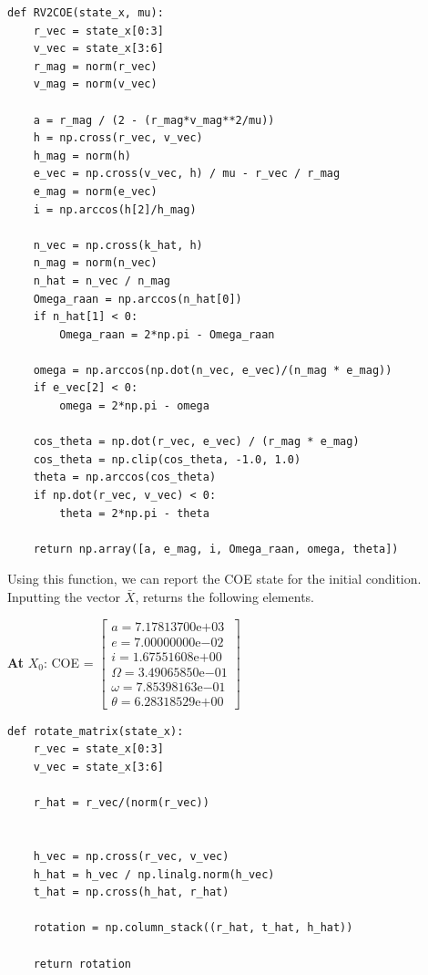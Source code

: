 \documentclass[a4paper, 12pt]{article}  %
\begin{document}
\begin{lstlisting}
def RV2COE(state_x, mu):
    r_vec = state_x[0:3]
    v_vec = state_x[3:6]
    r_mag = norm(r_vec)
    v_mag = norm(v_vec)
    
    a = r_mag / (2 - (r_mag*v_mag**2/mu))
    h = np.cross(r_vec, v_vec)
    h_mag = norm(h)
    e_vec = np.cross(v_vec, h) / mu - r_vec / r_mag
    e_mag = norm(e_vec)
    i = np.arccos(h[2]/h_mag)
    
    n_vec = np.cross(k_hat, h)
    n_mag = norm(n_vec)
    n_hat = n_vec / n_mag
    Omega_raan = np.arccos(n_hat[0])
    if n_hat[1] < 0:
        Omega_raan = 2*np.pi - Omega_raan
    
    omega = np.arccos(np.dot(n_vec, e_vec)/(n_mag * e_mag))
    if e_vec[2] < 0:
        omega = 2*np.pi - omega
        
    cos_theta = np.dot(r_vec, e_vec) / (r_mag * e_mag)
    cos_theta = np.clip(cos_theta, -1.0, 1.0)  
    theta = np.arccos(cos_theta)
    if np.dot(r_vec, v_vec) < 0:
        theta = 2*np.pi - theta
    
    return np.array([a, e_mag, i, Omega_raan, omega, theta])
\end{lstlisting}

Using this function, we can report the COE state for the initial condition. Inputting the vector $\bar{X}$, returns the following elements.

\begin{center}
    \textbf{At } $X_0$:
    COE =
    $\begin{bmatrix}
    a = 7.17813700\mathrm{e}{+03} \\
    e =  7.00000000\mathrm{e}{-02} \\
    i = 1.67551608\mathrm{e}{+00} \\
    \Omega = 3.49065850\mathrm{e}{-01} \\
    \omega = 7.85398163\mathrm{e}{-01} \\
    \theta = 6.28318529\mathrm{e}{+00}
    \end{bmatrix}$  
\end{center}

\begin{lstlisting}
def rotate_matrix(state_x):
    r_vec = state_x[0:3]
    v_vec = state_x[3:6]
    
    r_hat = r_vec/(norm(r_vec))
    

    h_vec = np.cross(r_vec, v_vec)
    h_hat = h_vec / np.linalg.norm(h_vec)  
    t_hat = np.cross(h_hat, r_hat)  

    rotation = np.column_stack((r_hat, t_hat, h_hat))
    
    return rotation
\end{lstlisting}
\end{document}
